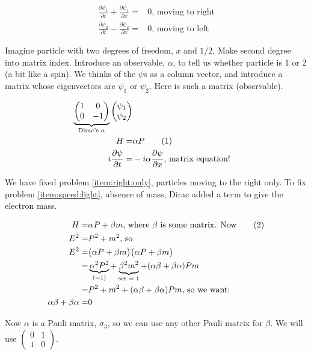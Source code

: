 \documentclass[]{article}
\newcommand\numberthis{\addtocounter{equation}{1}\tag{\theequation}}
\begin{document}
\begin{align*}
	\frac{\partial \psi_1}{\partial t} + \frac{\partial \psi_1}{\partial x}=&0 \text{, moving to right}\\
	\frac{\partial \psi_2}{\partial t} - \frac{\partial \psi_2}{\partial x}=&0 \text{, moving to left}
\end{align*}

Imagine particle with two degrees of freedom, $x$ and $1/2$. Make second degree into matrix index. Introduce an observable, $\alpha$, to tell us whether particle is 1 or 2 (a bit like a spin). We thinks of the $\psi$s as a column vector, and introduce a matrix whose eigenvectors are $\psi_1$ or $\psi_2$. Here is such a matrix (observable).

\begin{align*}
	\underbrace{
		\begin{pmatrix}
			1 & 0\\
			0 & -1
		\end{pmatrix}
	}_\text{Dirac's $\alpha$}
	\begin{pmatrix}
		\psi_1\\
		\psi_2
	\end{pmatrix}\\
	H =& \alpha P \numberthis \label{eq:dirac:1d:hp}\\
	i\frac{\partial \psi}{\partial t} =& -i \alpha \frac{\partial \psi}{\partial x} \text{, matrix equation!}
\end{align*}

We have fixed problem \ref{item:right:only}, particles moving to the right only. To fix problem \ref{item:speed:light}, absence of mass, Dirac added a term to give the electron mass. 

\begin{align*}
	H =& \alpha P + \beta m \text{, where $\beta$ is some matrix. Now} \numberthis \label{eq:dirac:1D:m}\\
	E^2 =& P^2 + m^2 \text{, so}\\
	E^2 =& \big(\alpha P + \beta m \big) \big(\alpha P + \beta m \big)\\
	=& \underbrace{\alpha^2 P^2}_\text{(=1)} + \underbrace{\beta^2 m^2}_\text{set  $=1$} + (\alpha \beta + \beta \alpha) P m\\
	=&  P^2 + m^2 + (\alpha \beta + \beta \alpha) P m \text{, so we want:}\\
	\alpha \beta + \beta \alpha=&0 
\end{align*}

Now $\alpha$ is a Pauli matrix, $\sigma_3$, so we can use any other Pauli matrix for $\beta$. We will use
$
	\begin{pmatrix}
		0&1\\
		1&0
	\end {pmatrix}
$.
\end{document}
